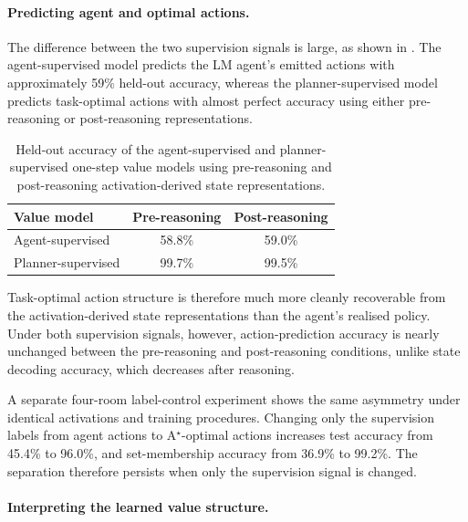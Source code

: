 \documentclass{article}
\begin{document}
\paragraph{Predicting agent and optimal actions.}
The difference between the two supervision signals is large, as shown in . 
The agent-supervised model predicts the LM agent's emitted actions with approximately 59\% held-out accuracy, whereas the planner-supervised model predicts task-optimal actions with almost perfect accuracy using either pre-reasoning or post-reasoning representations.

\begin{table}[htbp]
\centering
\small
\begin{tabular}{lcc}
\toprule
\textbf{Value model} & \textbf{Pre-reasoning} & \textbf{Post-reasoning} \\
\midrule
Agent-supervised & 58.8\% & 59.0\% \\
Planner-supervised & 99.7\% & 99.5\% \\
\bottomrule
\end{tabular}
\caption{Held-out accuracy of the agent-supervised and planner-supervised one-step value models using pre-reasoning and post-reasoning activation-derived state representations.}
\label{tab:value-results}
\end{table}

Task-optimal action structure is therefore much more cleanly recoverable from the activation-derived state representations than the agent's realised policy.
Under both supervision signals, however, action-prediction accuracy is nearly unchanged between the pre-reasoning and post-reasoning conditions, unlike state decoding accuracy, which decreases after reasoning.

A separate four-room label-control experiment shows the same asymmetry under identical activations and training procedures. Changing only the supervision labels from agent actions to A$^{\star}$-optimal actions increases test accuracy from 45.4\% to 96.0\%, and set-membership accuracy from 36.9\% to 99.2\%. The separation therefore persists when only the supervision signal is changed.

\paragraph{Interpreting the learned value structure.}
\end{document}
